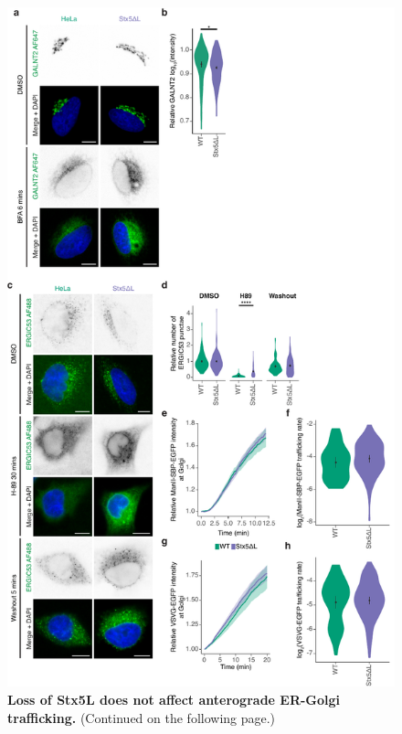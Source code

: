 \clearpage

\begin{figure}
    \includegraphics[keepaspectratio=true,width=\textwidth,height=\textheight]{chapters/chapter6/chapter6_SupplementaryFigure15.pdf}
    \caption{\textbf{Loss of Stx5L does not affect anterograde ER-Golgi trafficking.} (Continued on the following page.)}
    \label{fig:ch6supfig15}
\end{figure}
